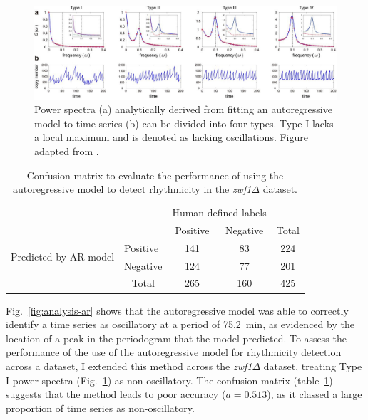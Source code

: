 \begin{figure}
  \centering
  \includegraphics[width=1.0\textwidth]{jiaFrequencyDomainAnalysis2020_2ab_adapted}
  \caption[
    Power spectra analytically derived from fitting an autoregressive model to time series can be divided into four types.
  ]{
    Power spectra (a) analytically derived from fitting an autoregressive model to time series (b) can be divided into four types.
    Type I lacks a local maximum and is denoted as lacking oscillations.
    Figure adapted from \textcite{jiaFrequencyDomainAnalysis2020}.
  }
  \label{fig:analysis-ar-classification}
\end{figure}


\begin{table}
  \centering
  \begin{tabular}{l|l|c|c|c}
    \multicolumn{2}{c}{}&\multicolumn{2}{c}{Human-defined labels}&\\
    \cline{3-4}
    \multicolumn{2}{c|}{}&Positive&Negative&\multicolumn{1}{c}{Total}\\
    \cline{2-4}
    \multirow{2}{*}{Predicted by AR model}& Positive & 141 & 83 & 224\\
    \cline{2-4}
    & Negative & 124 & 77 & 201\\
    \cline{2-4}
    \multicolumn{1}{c}{} & \multicolumn{1}{c}{Total} & \multicolumn{1}{c}{265} & \multicolumn{1}{c}{160} & \multicolumn{1}{c}{425}\\
  \end{tabular}
  \caption[
    Confusion matrix to evaluate the performance of using the autoregressive model \parencite{jiaFrequencyDomainAnalysis2020} to detect rhythmicity.
  ]{
    Confusion matrix to evaluate the performance of using the autoregressive model \parencite{jiaFrequencyDomainAnalysis2020} to detect rhythmicity in the \textit{zwf1$\Delta$} dataset.
  }
  \label{tab:analysis-ar-confusion-matrix}
\end{table}

Fig.\ \ref{fig:analysis-ar} shows that the autoregressive model was able to correctly identify a time series as oscillatory at a period of \SI{75.2}{\minute}, as evidenced by the location of a peak in the periodogram that the model predicted.
To assess the performance of the use of the autoregressive model for rhythmicity detection across a dataset, I extended this method across the \textit{zwf1$\Delta$} dataset, treating Type I power spectra (Fig.\ \ref{fig:analysis-ar-classification}) as non-oscillatory.
The confusion matrix (table~\ref{tab:analysis-ar-confusion-matrix}) suggests that the method leads to poor accuracy ($a = 0.513$), as it classed a large proportion of time series as non-oscillatory.


